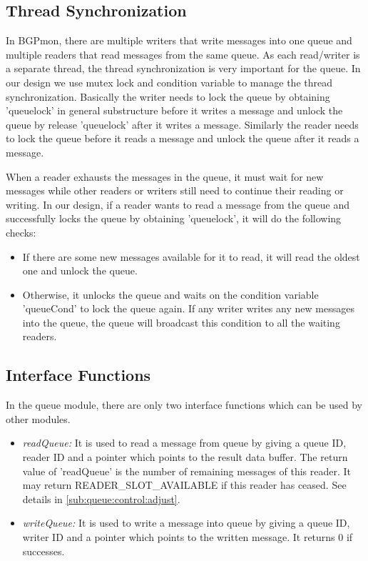 \subsection{\label{sub:queue:sync}{Thread Synchronization}}
In BGPmon, there are multiple writers that write messages into one queue and multiple readers that read messages from the same queue. As each read/writer is a separate thread, the thread synchronization is very important for the queue. In our design we use mutex lock and condition variable to manage the thread synchronization. Basically the writer needs to lock the queue by obtaining 'queuelock' in general substructure before it writes a message and unlock the queue by release  'queuelock'  after it writes a message. Similarly the reader needs to lock the queue before it reads a message and unlock the queue after it reads a message.

When a reader exhausts the messages in the queue, it must wait for new messages while other readers or writers still need to continue their reading or writing. In our design, if a reader wants to read a message from the queue and successfully locks the queue by obtaining 'queuelock', it will do the following checks:
 \begin{itemize}	
 	\item{If there are some new messages available for it to read, it will read the oldest one and unlock the queue.}
	\item{Otherwise, it unlocks the queue and waits on the condition variable 'queueCond' to lock the queue again. If any writer writes any new messages into the queue, the queue will broadcast this condition to all the waiting readers.}
\end{itemize} 

\subsection{Interface Functions}
In the queue module, there are only two interface functions which can be used by other modules.
 \begin{itemize}	
 	\item{\emph{readQueue:} It is used to read a message from queue by giving a queue ID, reader ID and a pointer which points to the result data buffer. The return value of 'readQueue' is the number of remaining messages of this reader. It may return READER\_SLOT\_AVAILABLE if this reader has ceased. See details in \ref{sub:queue:control:adjust}}.
	\item{\emph{writeQueue:}  It is used to write a message into queue by giving a queue ID, writer ID and a pointer which points to the written message. It returns 0 if successes.}
\end{itemize}  

